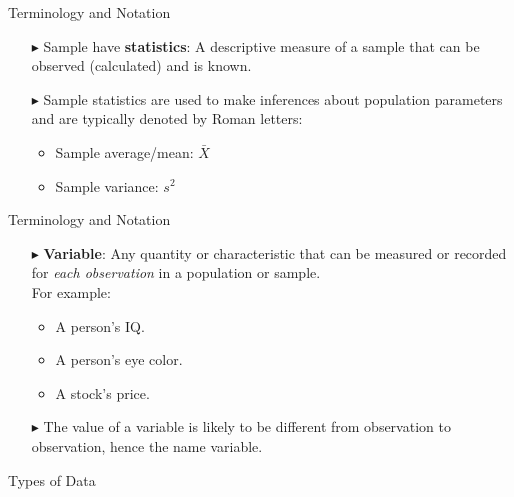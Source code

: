 \documentclass[12pt]{beamer}
\begin{document}
\begin{frame}{Terminology and Notation}
	\begin{itemize}
		\item[$\blacktriangleright$] Sample have {\bf statistics}: A descriptive measure of a sample that can be {\color{red}observed (calculated)} and is {\color{red}known}.
		\item[$\blacktriangleright$] Sample statistics are used to make inferences about population parameters and are typically denoted by Roman letters:
		\begin{itemize}
			\item Sample average/mean: $\bar{X}$
			\item Sample variance: $s^2$
		\end{itemize}
	\end{itemize}
\end{frame}

\begin{frame}{Terminology and Notation}
	\begin{itemize}
		\item[$\blacktriangleright$] {\bf Variable}: Any quantity or characteristic that can be measured or recorded for {\sl each observation} in a population or sample.\medskip\\
		For example:
		\begin{itemize}
			\item A person's IQ.
			\item A person's eye color.
			\item A stock's price.
		\end{itemize}
		\item[$\blacktriangleright$] The value of a variable is likely to be different from observation to observation, hence the name variable.
	\end{itemize}
\end{frame}

	\begin{frame}{Types of Data}
	\centering
	
\end{frame}
\end{document}
